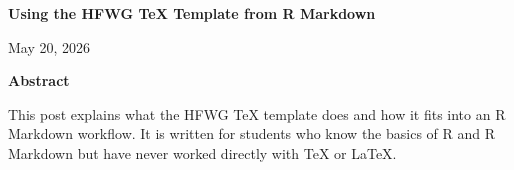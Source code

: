 \documentclass[12pt]{article}
\newif\ifhfwganon
\begin{document}
\begin{titlepage}
\thispagestyle{empty}

\vspace*{0.14\textheight}
\begin{center}


{\LARGE\bfseries Using the HFWG TeX Template from R
Markdown\par}


\vspace{2em}

\begin{singlespace}
{\normalsize

\hfwgauthorblock

\par\vspace{2\baselineskip}
\hfwgseriesblock

\ifhfwganon\else
\vspace{0.5em}
{\small May 20, 2026}\par
\fi

}
\end{singlespace}


\vspace{2em}

\begin{minipage}{0.8\textwidth}
\small\singlespacing
\textbf{Abstract}\par\vspace{0.25em}
This post explains what the HFWG TeX template does and how it fits into
an R Markdown workflow. It is written for students who know the basics
of R and R Markdown but have never worked directly with TeX or LaTeX.
\end{minipage}

\vfill


\end{center}
\end{titlepage}
\fi\fi
\fi\fi
\end{document}
